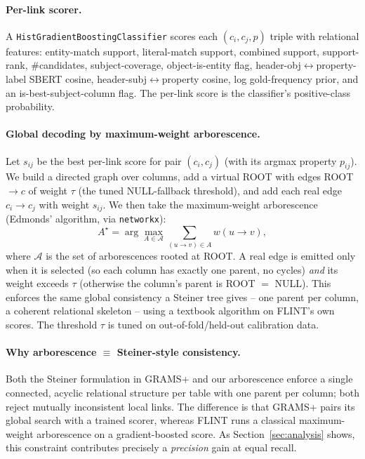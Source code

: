 \documentclass[11pt]{article}
\begin{document}
\paragraph{Per-link scorer.} A \texttt{HistGradientBoostingClassifier} scores each
$(c_i,c_j,p)$ triple with relational features: entity-match support, literal-match
support, combined support, support-rank, \#candidates, subject-coverage,
object-is-entity flag, header-obj$\leftrightarrow$property-label SBERT cosine,
header-subj$\leftrightarrow$property cosine, log gold-frequency prior, and an
is-best-subject-column flag. The per-link score is the classifier's
positive-class probability.

\paragraph{Global decoding by maximum-weight arborescence.} Let $s_{ij}$ be the best
per-link score for pair $(c_i,c_j)$ (with its argmax property $p_{ij}$). We build a
directed graph over columns, add a virtual ROOT with edges ROOT$\to c$ of weight
$\tau$ (the tuned NULL-fallback threshold), and add each real edge $c_i\!\to\!c_j$
with weight $s_{ij}$. We then take the maximum-weight arborescence (Edmonds'
algorithm, via \texttt{networkx}):
\[
A^\star = \arg\max_{A\in\mathcal{A}} \sum_{(u\to v)\in A} w(u\to v),
\]
where $\mathcal{A}$ is the set of arborescences rooted at ROOT. A real edge is
emitted only when it is selected (so each column has exactly one parent, no cycles)
\emph{and} its weight exceeds $\tau$ (otherwise the column's parent is ROOT $=$
NULL). This enforces the same global consistency a Steiner tree gives -- one parent
per column, a coherent relational skeleton -- using a textbook algorithm on FLINT's
own scores. The threshold $\tau$ is tuned on out-of-fold/held-out calibration data.

\paragraph{Why arborescence $\equiv$ Steiner-style consistency.} Both the Steiner
formulation in GRAMS+ and our arborescence enforce a single connected, acyclic
relational structure per table with one parent per column; both reject mutually
inconsistent local links. The difference is that GRAMS+ pairs its global search with
a trained scorer, whereas FLINT runs a classical maximum-weight arborescence on a
gradient-boosted score. As Section~\ref{sec:analysis} shows, this constraint
contributes precisely a \emph{precision} gain at equal recall.
\end{document}

